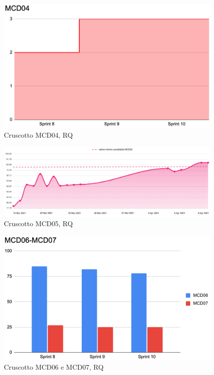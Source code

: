 \begin{figure}[H] 
    \centering
    \includegraphics[scale = 0.63]{immagini/MCD04.png}
    \caption{Cruscotto MCD04, RQ}
\end{figure}

\begin{figure}[H] 
    \centering
    \includegraphics[scale = 0.5]{immagini/MCD05.png}
    \caption{Cruscotto MCD05, RQ}
\end{figure}

\begin{figure}[H] 
    \centering
    \includegraphics[scale = 0.63]{immagini/MCD06-07.png}
    \caption{Cruscotto MCD06 e MCD07, RQ}
\end{figure}